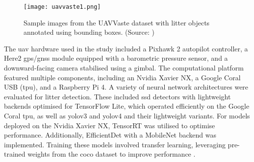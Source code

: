 \begin{figure}[!htbp]
    \centering
    \texttt{[image: uavvaste1.png]}
    \caption{Sample images from the UAVVaste dataset with litter objects annotated using bounding boxes. (Source: \cite{uavvaste})}
    \label{fig:uavvaste1}
\end{figure}

The \gls{uav} hardware used in the study included a Pixhawk 2 autopilot controller, a Here2 \gls{gps}/\gls{gnss} module equipped with a barometric pressure sensor, and a downward-facing camera stabilised using a gimbal. The computational platform featured multiple components, including an Nvidia Xavier NX, a Google Coral USB (\gls{tpu}), and a Raspberry Pi 4. A variety of neural network architectures were evaluated for litter detection. These included \gls{ssd} detectors with lightweight backends optimised for TensorFlow Lite, which operated efficiently on the Google Coral \gls{tpu}, as well as \gls{yolo}v3 and \gls{yolo}v4 and their lightweight variants. For models deployed on the Nvidia Xavier NX, TensorRT was utilised to optimise performance. Additionally, EfficientDet with a MobileNet backend was implemented. Training these models involved transfer learning, leveraging pre-trained weights from the \gls{coco} dataset to improve performance \cite{uavvaste}.


